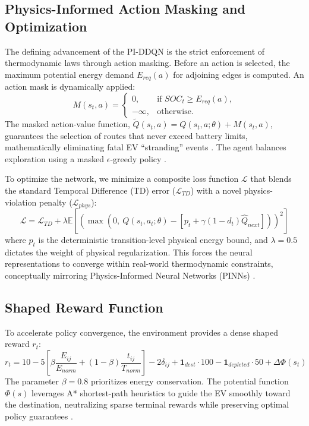 \documentclass{article}
\begin{document}
\subsection{Physics-Informed Action Masking and Optimization}
The defining advancement of the PI-DDQN is the strict enforcement of thermodynamic laws through action masking. Before an action is selected, the maximum potential energy demand $E_{req}(a)$ for adjoining edges is computed. An action mask is dynamically applied:
\begin{equation}
M(s_t, a) = 
\begin{cases}
0, & \text{if } SOC_t \ge E_{req}(a),\\
-\infty, & \text{otherwise.}
\end{cases}
\end{equation}
The masked action-value function, $\tilde{Q}(s_t, a) = Q(s_t, a; \theta) + M(s_t, a)$, guarantees the selection of routes that never exceed battery limits, mathematically eliminating fatal EV ``stranding'' events \cite{zhang2023ddqnper}. The agent balances exploration using a masked $\epsilon$-greedy policy \cite{sutton2018rl}.

To optimize the network, we minimize a composite loss function $\mathcal{L}$ that blends the standard Temporal Difference (TD) error ($\mathcal{L}_{TD}$) with a novel physics-violation penalty ($\mathcal{L}_{phys}$):
\begin{equation}
\mathcal{L} = \mathcal{L}_{TD} + \lambda \mathbb{E}\left[\left(\max\left(0,\ Q(s_t, a_t; \theta) - \left[p_t + \gamma(1-d_t)\hat{Q}_{next}\right]\right)\right)^2\right]
\end{equation}
where $p_t$ is the deterministic transition-level physical energy bound, and $\lambda = 0.5$ dictates the weight of physical regularization. This forces the neural representations to converge within real-world thermodynamic constraints, conceptually mirroring Physics-Informed Neural Networks (PINNs) \cite{raissi2019pinn}.

\subsection{Shaped Reward Function}
To accelerate policy convergence, the environment provides a dense shaped reward $r_t$:
\begin{equation}
r_t = 10 - 5\left[\beta\frac{E_{ij}}{E_{norm}} + (1-\beta)\frac{t_{ij}}{T_{norm}}\right] - 2\delta_{ij} + \mathbf{1}_{dest}\cdot 100 - \mathbf{1}_{depleted}\cdot 50 + \Delta\Phi(s_t)
\label{eq:reward}
\end{equation}
The parameter $\beta = 0.8$ prioritizes energy conservation. The potential function $\Phi(s)$ leverages A* shortest-path heuristics \cite{hart1968formal} to guide the EV smoothly toward the destination, neutralizing sparse terminal rewards while preserving optimal policy guarantees \cite{ng1999policy}.
\end{document}
